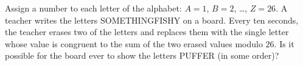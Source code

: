 Assign a number to each letter of the alphabet: $A=1$, $B=2$, \dots, $Z=26$. A teacher writes the letters SOMETHINGFISHY on a board. Every ten seconds, the teacher erases two of the letters and replaces them with the single letter whose value is congruent to the sum of the two erased values modulo $26$. Is it possible for the board ever to show the letters PUFFER (in some order)?
